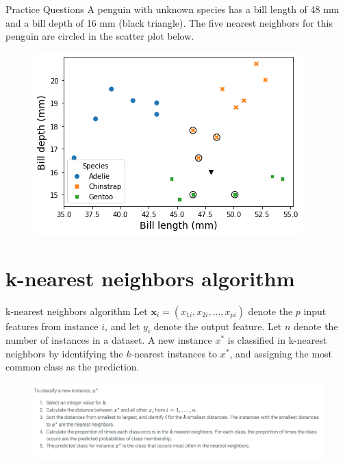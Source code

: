 \documentclass[8pt,dvipsnames]{beamer}
\begin{document}
\begin{frame}{Practice Questions}
	A penguin with unknown species has a bill length of 48 mm and a bill depth of 16 mm (black triangle). The five nearest neighbors for this penguin are circled in the scatter plot below.
	\begin{figure}[ht]
		\centering
		\includegraphics[scale=0.5]{imgs/knn_7.png}
	\end{figure}
\end{frame}

\section{k-nearest neighbors algorithm}
\begin{frame}{k-nearest neighbors algorithm}
	Let \(\mathbf{x}_{i}=\left(x_{1 i}, x_{2 i}, \ldots, x_{p i}\right)\) denote the \(p\) input features from instance \(i\), and let \(y_{i}\) denote the output feature. Let \(n\) denote the number of instances in a dataset. A new instance \(x^{*}\) is classified in k-nearest neighbors by identifying the \(k\)-nearest instances to \(x^{*}\), and assigning the most common class as the prediction.
	\begin{figure}[ht]
		\centering
		\includegraphics[width=\linewidth]{imgs/knn_8.png}
	\end{figure}
\end{frame}
\end{document}
